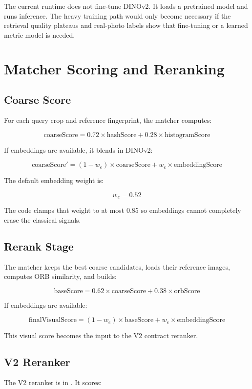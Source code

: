 \documentclass[11pt,a4paper]{article}
\begin{document}
The current runtime does not fine-tune DINOv2. It loads a pretrained model and runs inference. The heavy training path would only become necessary if the retrieval quality plateaus and real-photo labels show that fine-tuning or a learned metric model is needed.

\section{Matcher Scoring and Reranking}

\subsection{Coarse Score}

For each query crop and reference fingerprint, the matcher computes:

\[
\text{coarseScore} =
0.72 \times \text{hashScore}
+ 0.28 \times \text{histogramScore}
\]

If embeddings are available, it blends in DINOv2:

\[
\text{coarseScore}' =
(1 - w_e) \times \text{coarseScore}
+ w_e \times \text{embeddingScore}
\]

The default embedding weight is:

\[
w_e = 0.52
\]

The code clamps that weight to at most 0.85 so embeddings cannot completely erase the classical signals.

\subsection{Rerank Stage}

The matcher keeps the best coarse candidates, loads their reference images, computes ORB similarity, and builds:

\[
\text{baseScore} =
0.62 \times \text{coarseScore}
+ 0.38 \times \text{orbScore}
\]

If embeddings are available:

\[
\text{finalVisualScore} =
(1 - w_e) \times \text{baseScore}
+ w_e \times \text{embeddingScore}
\]

This visual score becomes the input to the V2 contract reranker.

\subsection{V2 Reranker}

The V2 reranker is in . It scores:
\end{document}
